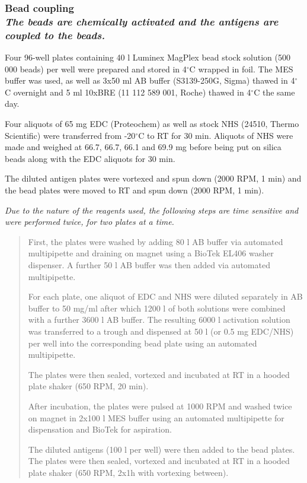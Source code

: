 \documentclass{article}
\begin{document}
\subsubsection[Bead coupling]{Bead coupling\\{\normalfont\slshape\normalsize The beads are chemically activated and the antigens are coupled to the beads.}}

Four 96-well plates containing 40 \textmu l Luminex MagPlex bead stock solution (500 000 beads) per well were prepared and stored in 4$^{\circ}$C wrapped in foil. The MES buffer was used, as well as 3x50 ml AB buffer (S3139-250G, Sigma) thawed in 4$^{\circ}$C overnight and 5 ml 10xBRE (11 112 589 001, Roche) thawed in 4$^{\circ}$C the same day.

Four aliquots of 65 mg EDC (Proteochem) as well as stock NHS (24510, Thermo Scientific) were transferred from -20$^{\circ}$C to RT for 30 min. Aliquots of NHS were made and weighed at 66.7, 66.7, 66.1 and 69.9 mg before being put on silica beads along with the EDC aliquots for 30 min.

The diluted antigen plates were vortexed and spun down (2000 RPM, 1 min) and the bead plates were moved to RT and spun down (2000 RPM, 1 min).

\textit{Due to the nature of the reagents used, the following steps are time sensitive and were performed twice, for two plates at a time.}
\begin{quote}
First, the plates were washed by adding 80 \textmu l AB buffer via automated multipipette and draining on magnet using a BioTek EL406 washer dispenser. A further 50 \textmu l AB buffer was then added via automated multipipette.

For each plate, one aliquot of EDC and NHS were diluted separately in AB buffer to 50 mg/ml after which 1200 \textmu l of both solutions were combined with a further 3600 \textmu l AB buffer. The resulting 6000 \textmu l activation solution was transferred to a trough and dispensed at 50 \textmu l (or 0.5 mg EDC/NHS) per well into the corresponding bead plate using an automated multipipette.

The plates were then sealed, vortexed and incubated at RT in a hooded plate shaker (650 RPM, 20 min).

After incubation, the plates were pulsed at 1000 RPM and washed twice on magnet in 2x100 \textmu l MES buffer using an automated multipipette for dispensation and BioTek for aspiration.

The diluted antigens (100 \textmu l per well) were then added to the bead plates. The plates were then sealed, vortexed and incubated at RT in a hooded plate shaker (650 RPM, 2x1h with vortexing between).
\end{quote}
\end{document}
